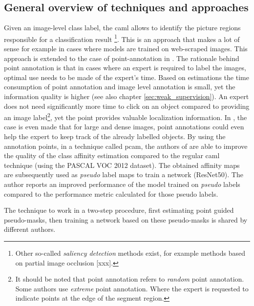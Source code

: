 \subsection{General overview of techniques and approaches}
\par{
    Given an image-level class label, the \Gls{caml}  allows to identify the picture regions responsible for a classification result \cite{Ahn2018, Ahn2019}
    \footnote{Other so-called \textit{saliency detection} methods exist, for example methods based on partial image occlusion [xxx].}.
    This is an approach that makes a lot of sense for example in cases where models are trained on web-scraped images.
    This approach is extended to the case of point-annotation in \cite{McEver2020}. 
    The rationale behind point annotation is that in cases where an expert is required to label the images, optimal use needs to be made of the expert's time.
    Based on estimations \cite{Bearman2015} the time consumption of point annotation and image level annotation is small, yet the information quality is higher (see also chapter \ref{sec:weak_supervision}).
    An expert does not need significantly more time to click on an object compared to providing an image label\footnote{
        It should be noted that point annotation refers to \textit{random} point annotation. Some authors \cite{Mainis} use \textit{extreme} point annotation. 
        Where the expert  is requested to indicate points at the edge of the segment region.
    }, yet the point provides valuable localization information.
    In \cite{McEver2020}, the case is even made that for large and dense images, point annotations could even help the expert to keep track of the already labelled objects.
    By using the annotation points, in a technique called \acrfull{pcam}, the authors of \cite{McEver2020} are able to improve the quality of the class affinity estimation compared to the regular \Gls{caml} technique (using the PASCAL VOC 2012 dataset).
    The obtained affinity maps are subsequently used as \textit{pseudo} label maps to train a network (ResNet50). 
    The author reports an improved performance of the model trained on \textit{pseudo} labels compared to the performance metric calculated for those pseudo labels.
}
\par{
    The technique to work in a two-step procedure, first estimating point guided pseudo-masks, then training a network based on these pseudo-masks is shared by different authors.
}
